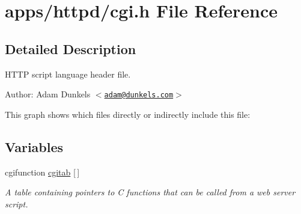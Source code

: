\hypertarget{a00034}{
\section{apps/httpd/cgi.h File Reference}
\label{a00034}
}


\subsection{Detailed Description}
HTTP script language header file. 

\begin{Desc}
\item[Author:]Adam Dunkels $<$\href{mailto:adam@dunkels.com}{\tt adam@dunkels.com}$>$ \end{Desc}




This graph shows which files directly or indirectly include this file:\subsection*{Variables}
\begin{CompactItemize}
\item 
\hypertarget{a00082_g04d2c4d8d3c35856348c04fa245a9bb3}{
cgifunction \hyperlink{a00082_g04d2c4d8d3c35856348c04fa245a9bb3}{cgitab} \mbox{[}$\,$\mbox{]}}
\label{a00082_g04d2c4d8d3c35856348c04fa245a9bb3}

\begin{CompactList}\small\item\em A table containing pointers to C functions that can be called from a web server script. \item\end{CompactList}\end{CompactItemize}
